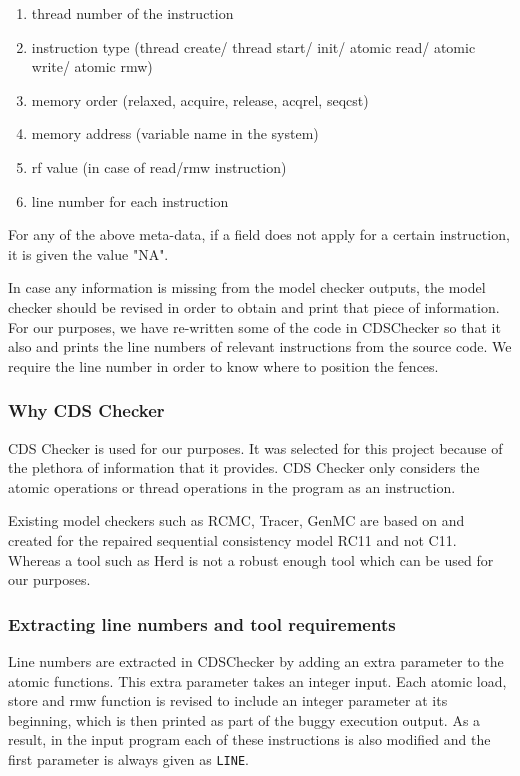 \begin{enumerate}
	\item thread number of the instruction
	\item instruction type (thread create/ thread start/ init/ atomic read/ atomic write/ atomic rmw)
	\item memory order (relaxed, acquire, release, acq\textunderscore rel, seq\textunderscore cst)
	\item memory address (variable name in the system)
	\item rf value (in case of read/rmw instruction)
	\item line number for each instruction
\end{enumerate}

\par
For any of the above meta-data, if a field does not apply for a certain instruction, it is given the value "NA".

\par
In case any information is missing from the model checker outputs, the model checker should be revised in order to obtain and print that piece of information. For our purposes, we have re-written some of the code in CDSChecker so that it also and prints the line numbers of relevant instructions from the source code. We require the line number in order to know where to position the fences.

\subsubsection{Why CDS Checker}
CDS Checker is used for our purposes. It was selected for this project because of the plethora of information that it provides. CDS Checker only considers the atomic operations or thread operations in the program as an instruction.

Existing model checkers such as RCMC, Tracer, GenMC are based on and created for the repaired sequential consistency model RC11 and not C11. Whereas a tool such as Herd is not a robust enough tool which can be used for our purposes. 

\subsubsection{Extracting line numbers and tool requirements}
Line numbers are extracted in CDSChecker by adding an extra parameter to the atomic functions. This extra parameter takes an integer input. Each atomic load, store and rmw function is revised to include an integer parameter at its beginning, which is then printed as part of the buggy execution output. As a result, in the input program each of these instructions is also modified and the first parameter is always given as {\tt{\textunderscore\textunderscore LINE\textunderscore\textunderscore}}.

